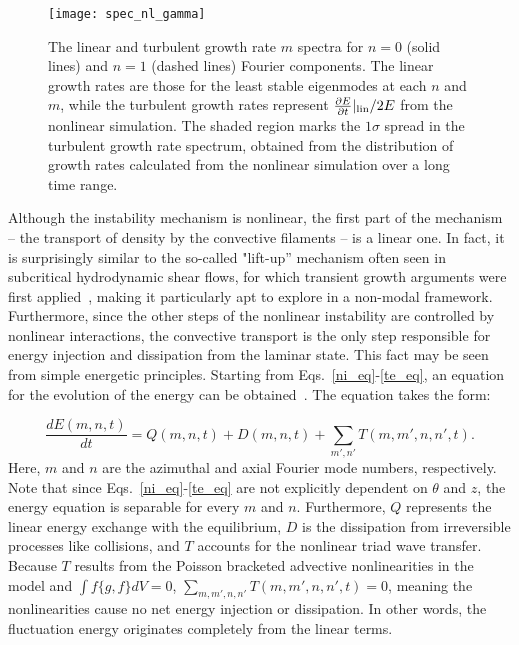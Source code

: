 \documentclass[showpacs,preprintnumbers,amsmath,amssymb,superscriptaddress,aip]{revtex4-1}
\def\beq{\begin{equation}}
\def\eeq{\end{equation}}
\newcommand{\diff}[2]{\frac{d#1}{d#2}}
\newcommand{\pdiff}[2]{\frac{\partial#1}{\partial#2}}
\begin{document}
\begin{figure}
\centerline{\texttt{[image: spec\_nl\_gamma]}}
\caption{The linear and turbulent growth rate $m$ spectra for $n=0$ (solid lines) and $n=1$ (dashed lines) Fourier components. The linear growth rates are those for the least stable eigenmodes at each
$n$ and $m$, while the turbulent growth rates represent $\pdiff{E}{t}|_{\rm{lin}}/2 E$ from the nonlinear simulation. The shaded region marks the $1 \sigma$ spread in the turbulent growth rate spectrum,
obtained from the distribution of growth rates calculated from the nonlinear simulation over a long time range.}
\label{spec_nl_gamma}
\end{figure}

Although the instability mechanism is nonlinear, the first part of the mechanism -- the transport of density by the convective filaments -- is a linear one. 
In fact, it is surprisingly similar to the so-called "lift-up'' mechanism often seen in subcritical hydrodynamic shear flows, for which transient growth arguments were first applied~\cite{trefethen1993},
making it particularly apt to explore in a non-modal framework. Furthermore, since the other steps of the nonlinear instability
are controlled by nonlinear interactions, the convective transport is the only step responsible for energy injection and dissipation from the laminar state. This fact may be seen from simple
energetic principles. Starting from Eqs.~\ref{ni_eq}-\ref{te_eq},
an equation for the evolution of the energy can be obtained~\cite{friedman2012b,friedman2013}. The equation takes the form:

\beq
\label{dEdt_def}
\diff{E(m,n,t)}{t} = Q(m,n,t) + D(m,n,t) + \sum_{m',n'} T(m,m',n,n',t).
\eeq
Here, $m$ and $n$ are the azimuthal and axial Fourier mode numbers, respectively. Note that since Eqs.~\ref{ni_eq}-\ref{te_eq} are not explicitly dependent on $\theta$ and $z$, the energy equation
is separable for every $m$ and $n$. Furthermore, $Q$ represents the linear energy exchange with the equilibrium, $D$ is the dissipation from irreversible processes
like collisions, and $T$ accounts for the nonlinear triad wave transfer. Because $T$ results from the Poisson bracketed advective nonlinearities in the model and $\int f \{g,f\} dV = 0$, 
$\sum_{m,m',n,n'} T(m,m',n,n',t)=0$, meaning the nonlinearities cause no net energy injection or dissipation. In other words, the fluctuation energy originates completely from the linear terms.
\end{document}
